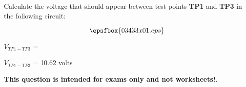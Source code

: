 

Calculate the voltage that should appear between test points {\bf TP1} and {\bf TP3} in the following circuit:

$$\epsfbox{03433x01.eps}$$

$V_{TP1-TP3}$ = 







$V_{TP1-TP3}$ = 10.62 volts







{\bf This question is intended for exams only and not worksheets!}.



